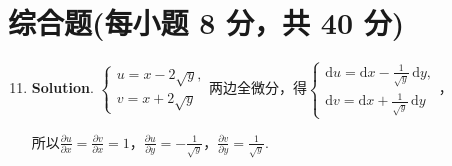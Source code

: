 \documentclass[../main.tex]{subfiles}
\begin{document}
\section{综合题(每小题 8 分，共 40 分)}
\begin{enumerate}
    \setcounter{enumi}{10}
    \item \textbf{Solution}. $\begin{cases}
                  u = x-2\sqrt{y}, \\
                  v = x+2\sqrt{y}
              \end{cases}$两边全微分，得$\begin{cases}
                  \mathrm{d}u = \mathrm{d}x - \frac{1}{\sqrt{y}}\,\mathrm{d}y, \\[6pt]
                  \mathrm{d}v = \mathrm{d}x + \frac{1}{\sqrt{y}}\,\mathrm{d}y
              \end{cases}$，

          所以$\frac{\partial u}{\partial x}= \frac{\partial v}{\partial x}= 1$，$\frac{\partial
                  u}{\partial y}= -\frac{1}{\sqrt{y}}$，$\frac{\partial v}{\partial y}= \frac{1}{\sqrt{y}}$.


\end{enumerate}
\end{document}
